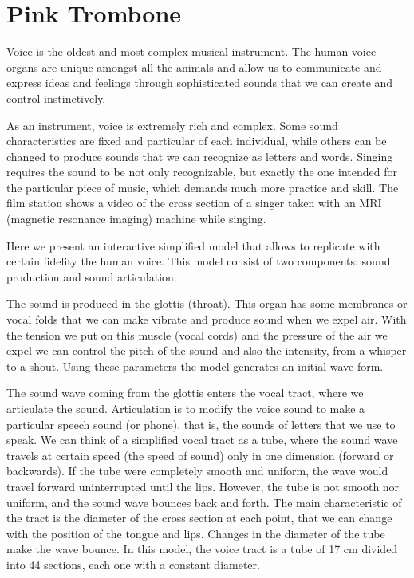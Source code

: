 \section{Pink Trombone}
Voice is the oldest and most complex musical instrument. The human voice organs are unique amongst all the animals and allow us to communicate and express ideas and feelings through sophisticated sounds that we can create and control instinctively.

As an instrument, voice is extremely rich and complex. Some sound characteristics are fixed and particular of each individual, while others can be changed to produce sounds that we can recognize as letters and words. Singing requires the sound to be not only recognizable, but exactly the one intended for the particular piece of music, which demands much more practice and skill. The film station shows a video of the cross section of a singer taken with an MRI (magnetic resonance imaging) machine while singing.

Here we present an interactive simplified model that allows to replicate with certain fidelity the human voice. This model consist of two components: sound production and sound articulation.

The sound is produced in the glottis (throat). This organ has some membranes or vocal folds that we can make vibrate and produce sound when we expel air. With the tension we put on this muscle (vocal cords) and the pressure of the air we expel we can control the pitch of the sound and also the intensity, from a whisper to a shout. Using these parameters the model generates an initial wave form.

The sound wave coming from the glottis enters the vocal tract, where we articulate the sound. Articulation is to modify the voice sound to make a particular speech sound (or phone), that is, the sounds of letters that we use to speak. We can think of a simplified vocal tract as a tube, where the sound wave travels at certain speed (the speed of sound) only in one dimension (forward or backwards). If the tube were completely smooth and uniform, the wave would travel forward uninterrupted until the lips. However, the tube is not smooth nor uniform, and the sound wave bounces back and forth. The main characteristic of the tract is the diameter of the cross section at each point, that we can change with the position of the tongue and lips. Changes in the diameter of the tube make the wave bounce. In this model, the voice tract is a tube of 17 cm divided into 44 sections, each one with a constant diameter.

